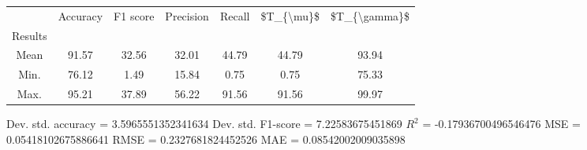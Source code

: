 \begin{tabular}{|c|c|c|c|c|c|c|}
\toprule
{} &  Accuracy &  F1 score &  Precision &  Recall &  \$T\_\{\textbackslash mu\}\$ &  \$T\_\{\textbackslash gamma\}\$ \\
Results &           &           &            &         &            &               \\
\hline
Mean    &     91.57 &     32.56 &      32.01 &   44.79 &      44.79 &         93.94 \\
Min.    &     76.12 &      1.49 &      15.84 &    0.75 &       0.75 &         75.33 \\
Max.    &     95.21 &     37.89 &      56.22 &   91.56 &      91.56 &         99.97 \\
\bottomrule
\end{tabular}

 Dev. std. accuracy = 3.5965551352341634
 Dev. std. F1-score = 7.22583675451869
 $R^2$ = -0.17936700496546476
 MSE = 0.05418102675886641
 RMSE = 0.2327681824452526
 MAE = 0.08542002009035898